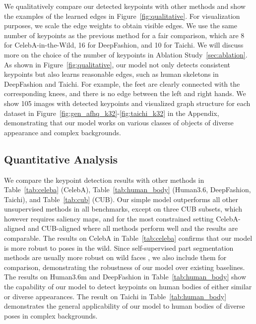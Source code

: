 \documentclass{article}
\begin{document}
We qualitatively compare our detected keypoints with other methods and show the examples of the learned edges in Figure~\ref{fig:qualitative}. For visualization purposes, we scale the edge weights 
to obtain visible edges.
We use the same number of keypoints as the previous method \cite{he2022ganseg} for a fair comparison, which are 8 for CelebA-in-the-Wild, 16 for DeepFashion, and 10 for Taichi. We will discuss more on the choice of the number of keypoints in Ablation Study~\ref{sec:ablation}. As shown in Figure~\ref{fig:qualitative}, our model not only detects consistent keypoints but also learns reasonable edges, such as human skeletons in DeepFashion and Taichi. For example, the feet are clearly connected with the corresponding knees, and there is no edge between the left and right hands. We show 105 images with detected keypoints and visualized graph structure for each dataset in Figure~\ref{fig:gen_afhq_k32}-\ref{fig:taichi_k32} in the Appendix, demonstrating that our model works on various classes of objects of diverse appearance and complex backgrounds.


\subsection{Quantitative Analysis} \label{sec:quantitative}

We compare the keypoint detection results with other methods in Table~\ref{tab:celeba} (CelebA), Table~\ref{tab:human_body} (Human3.6, DeepFashion, Taichi), and Table~\ref{tab:cub} (CUB).
Our simple model outperforms all other unsupervised methods in all benchmarks, except \cite{hung2019scops} on three CUB subsets, which however requires saliency maps, and for the most constrained setting CelebA-aligned and CUB-aligned where all methods perform well and the results are comparable. 
The results on CelebA in Table~\ref{tab:celeba} confirms that our model is more robust to poses in the wild. Since self-supervised part segmentation methods are usually more robust on wild faces \cite{liu2021unsupervised, hung2019scops, he2022ganseg}, we also include them for comparison, demonstrating the robustness of our model over existing baselines.
The results on Human3.6m and DeepFashion in Table~\ref{tab:human_body} show the capability of our model to detect keypoints on human bodies of either similar or diverse appearances.
The result on Taichi in Table~\ref{tab:human_body} demonstrates the general applicability of our model to human bodies of diverse poses in complex backgrounds.
\end{document}
